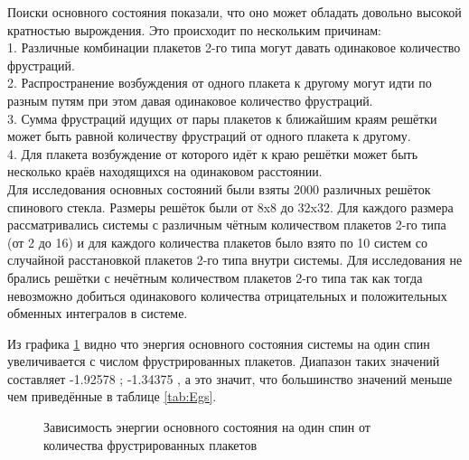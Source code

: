 \documentclass[utf8, babel, sor, jor, amsmath, amssymb, reprint]{elsarticle} %
\begin{document}
Поиски основного состояния показали, что оно может обладать довольно высокой кратностью вырождения. Это происходит по нескольким причинам:\\
1. Различные комбинации плакетов 2-го типа могут давать одинаковое количество фрустраций.\\
2. Распространение возбуждения от одного плакета к другому могут идти по разным путям при этом давая одинаковое количество фрустраций.\\
3. Сумма фрустраций идущих от пары плакетов к ближайшим краям решётки может быть равной количеству фрустраций от одного плакета к другому.\\
4. Для плакета возбуждение от которого идёт к краю решётки может быть несколько краёв находящихся на одинаковом расстоянии.\\

Для исследования основных состояний были взяты 2000 различных решёток спинового стекла.
Размеры решёток были от 8x8 до 32x32. Для каждого размера рассматривались системы с различным чётным количеством плакетов 2-го типа (от 2 до 16) и для каждого количества плакетов было взято по 10 систем со случайной расстановкой плакетов 2-го типа внутри системы. Для исследования не  брались решётки с нечётным количеством плакетов 2-го типа так как тогда невозможно добиться одинакового количества отрицательных и положительных обменных интегралов в системе. 

Из графика \ref{fig:Egs_N_F} видно что энергия основного состояния системы на один спин увеличивается с числом фрустрированных плакетов. Диапазон таких значений составляет -1.92578 ; -1.34375 , а это значит, что большинство значений меньше чем приведённые в таблице \ref{tab:Egs}. 

\begin{figure}[H]
	\centering
	\caption{Зависимость энергии основного состояния на один спин от количества фрустрированных плакетов}
	\label{fig:Egs_N_F}
\end{figure}
\end{document}
